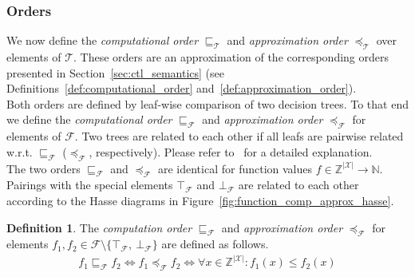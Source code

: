 \documentclass[11pt,a4paper,titlepage]{article}
\theoremstyle{definition}
\newtheorem{definition}{Definition}[section]
\begin{document}
\subsubsection*{Orders}

We now define the 
\textit{computational order} $\sqsubseteq_{\mathcal{T}}$ and \textit{approximation order} $\preceq_{\mathcal{T}}$
over elements of $\mathcal{T}$. These orders are an approximation of the corresponding orders presented in 
Section~\ref{sec:ctl_semantics} (see Definitions~\ref{def:computational_order} and~\ref{def:approximation_order}).\\

Both orders are defined by leaf-wise comparison of two decision trees. To that end we define the   
\textit{computational order} $\sqsubseteq_{\mathcal{F}}$ and \textit{approximation order} $\preceq_{\mathcal{F}}$
for elements of $\mathcal{F}$. Two trees are related to each other if all leafs 
are pairwise related w.r.t. $\sqsubseteq_{\mathcal{F}}$ ($\preceq_{\mathcal{F}}$, respectively). 
Please refer to~\cite{UrbanPhd} for a detailed explanation.\\

The two orders $\sqsubseteq_{\mathcal{F}}$ and $\preceq_{\mathcal{F}}$ are identical for function values 
$f \in \mathbb{Z}^{|\mathcal{X}|} \rightarrow \mathbb{N}$.
Pairings with the special elements $\top_{\mathcal{F}}$ and $\bot_{\mathcal{F}}$ are related to each other according to the
Hasse diagrams in Figure~\ref{fig:function_comp_approx_hasse}. 

\begin{definition}\label{def:fun_comp_approx_order}
    The \textit{computation order} $\sqsubseteq_{\mathcal{F}}$ and \textit{approximation order} $\preceq_{\mathcal{F}}$
    for elements  $f_1, f_2 \in \mathcal{F} \setminus \{\top_{\mathcal{F}}, \ \bot_{\mathcal{F}} \} $ are defined as follows.
    \begin{align*}
        f_1 \sqsubseteq_{\mathcal{F}} f_2  \iff  f_1 \preceq_{\mathcal{F}} f_2 \iff
        \forall x \in \mathbb{Z}^{|\mathcal{X}|} \colon f_1(x) \leq f_2(x)
    \end{align*}
\end{definition}
\end{document}
